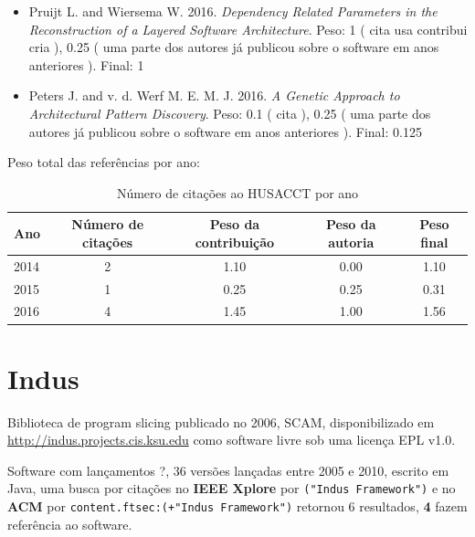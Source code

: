 \begin{itemize}
\item Pruijt L. and Wiersema W.
      2016.
        \textit{ Dependency Related Parameters in the Reconstruction of a Layered Software Architecture}.
      Peso:
      1 (
          cita
          usa
          contribui
          cria
      ),
      0.25 (
uma parte dos autores já publicou sobre o software em anos anteriores
      ).
      Final:
      1

\item Peters J. and v. d. Werf M. E. M. J.
      2016.
        \textit{ A Genetic Approach to Architectural Pattern Discovery}.
      Peso:
      0.1 (
          cita
      ),
      0.25 (
uma parte dos autores já publicou sobre o software em anos anteriores
      ).
      Final:
      0.125

\end{itemize}

Peso total das referências por ano:

\begin{table}[h]
\caption{Número de citações ao HUSACCT  por ano}
\centering
\begin{tabular}{| l | c | c | c | c |}
  \hline
  Ano & Número de citações & Peso da contribuição & Peso da autoria & Peso final \\
  \hline
  2014
    & 2
    & 1.10
    & 0.00
    & 1.10 \\
  2015
    & 1
    & 0.25
    & 0.25
    & 0.31 \\
  2016
    & 4
    & 1.45
    & 1.00
    & 1.56 \\
  \hline
\end{tabular}
\end{table}


\section{Indus}

Biblioteca de program slicing
publicado no 2006, SCAM,
disponibilizado em \url{http://indus.projects.cis.ksu.edu}
como software livre
sob uma licença EPL v1.0.

Software com lançamentos ?,
36 versões lançadas
entre 2005 e 2010,
escrito em Java,
uma busca por citações no {\bf IEEE Xplore} por
\texttt{("Indus Framework")}
e no {\bf ACM} por
\texttt{content.ftsec:(+"Indus Framework")}
retornou
6 resultados,
{\bf 4} fazem referência ao software.


